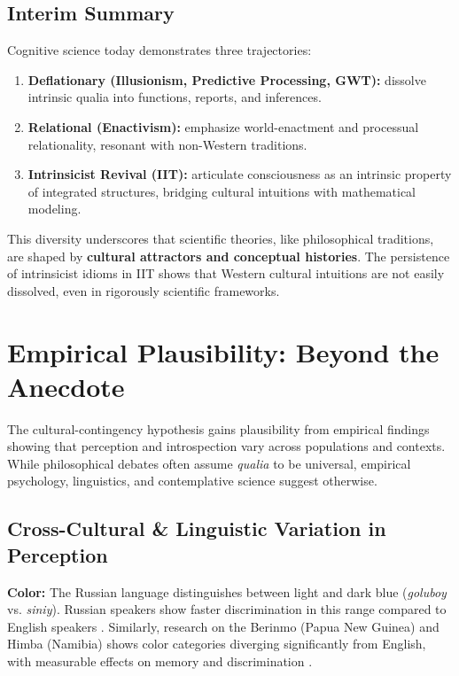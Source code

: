 \documentclass[11pt,a4paper]{article}
\newcommand{\qualia}{\emph{qualia}}
\begin{document}
\subsection{Interim Summary}

Cognitive science today demonstrates three trajectories:

\begin{enumerate}
\item \textbf{Deflationary (Illusionism, Predictive Processing, GWT):} dissolve intrinsic qualia into functions, reports, and inferences.
\item \textbf{Relational (Enactivism):} emphasize world-enactment and processual relationality, resonant with non-Western traditions.
\item \textbf{Intrinsicist Revival (IIT):} articulate consciousness as an intrinsic property of integrated structures, bridging cultural intuitions with mathematical modeling.
\end{enumerate}

This diversity underscores that scientific theories, like philosophical traditions, are shaped by \textbf{cultural attractors and conceptual histories}. The persistence of intrinsicist idioms in IIT shows that Western cultural intuitions are not easily dissolved, even in rigorously scientific frameworks.

\section{Empirical Plausibility: Beyond the Anecdote}

The cultural-contingency hypothesis gains plausibility from empirical findings showing that perception and introspection vary across populations and contexts. While philosophical debates often assume \qualia{} to be universal, empirical psychology, linguistics, and contemplative science suggest otherwise.

\subsection{Cross-Cultural \& Linguistic Variation in Perception}

\textbf{Color:} The Russian language distinguishes between light and dark blue (\emph{goluboy} vs. \emph{siniy}). Russian speakers show faster discrimination in this range compared to English speakers \cite{winawer2007}. Similarly, research on the Berinmo (Papua New Guinea) and Himba (Namibia) shows color categories diverging significantly from English, with measurable effects on memory and discrimination \cite{roberson2005}.
\end{document}
